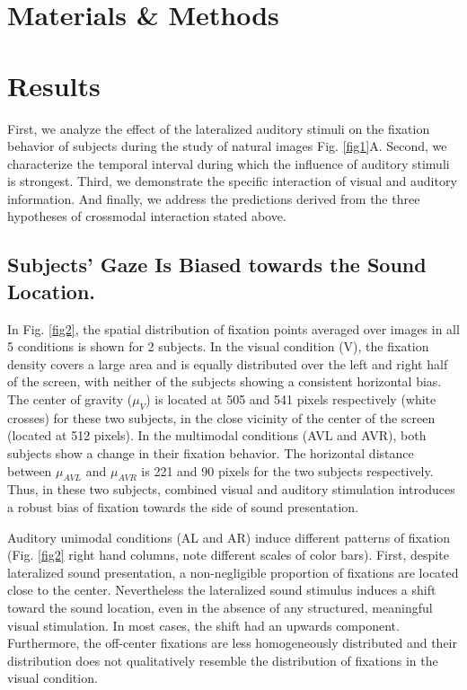 \section{Materials \& Methods} 

\label{part_cm_mm} 



\section{Results}

First, we analyze the effect of the lateralized auditory stimuli on the
fixation behavior of subjects during the study of natural images
Fig. \ref{fig1}A. Second, we characterize the temporal interval during which the
influence of auditory stimuli is strongest. Third, we demonstrate the
specific interaction of visual and auditory information. And finally, we
address the predictions derived from the three hypotheses of crossmodal
interaction stated above. 


\subsection{Subjects' Gaze Is Biased towards the Sound Location.} 


In Fig. \ref{fig2}, the spatial distribution of fixation points
averaged over images in all 5 conditions is shown for 2 subjects. In the
visual condition (V), the fixation density covers a large area and is
equally distributed over the left and right half of the screen, with
neither of the subjects showing a consistent horizontal bias. The center of
gravity ($\mu_{V}$) is located at 505 and 541 pixels respectively (white
crosses) for these two subjects, in the close vicinity of the center of the
screen (located at 512 pixels). In the multimodal conditions (AVL and AVR),
both subjects show a change in their fixation behavior. The horizontal
distance between $\mu_{AVL}$ and $\mu_{AVR}$ is 221 and 90 pixels for the
two subjects respectively. Thus, in these two subjects, combined visual and
auditory stimulation introduces a robust bias of fixation towards the side
of sound presentation. 

Auditory unimodal conditions (AL and AR) induce different patterns of
fixation (Fig. \ref{fig2} right hand columns, note different scales of color
bars). First, despite lateralized sound presentation, a non-negligible
proportion of fixations are located close to the center. Nevertheless the
lateralized sound stimulus induces a shift toward the sound location, even
in the absence of any structured, meaningful visual stimulation. In most
cases, the shift had an upwards component. Furthermore, the off-center
fixations are less homogeneously distributed and their distribution does not
qualitatively resemble the distribution of fixations in the visual
condition. 

